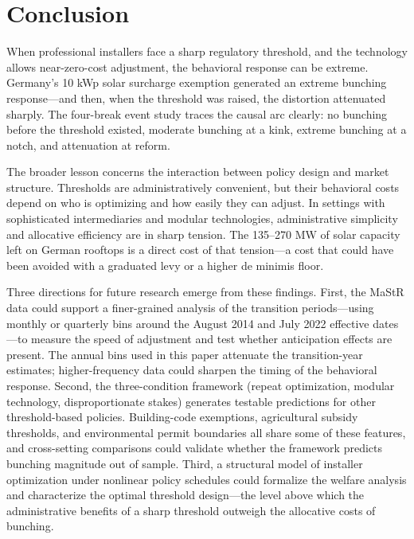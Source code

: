 \documentclass[12pt]{article}
\begin{document}



\section{Conclusion}
\label{sec:conclusion}

When professional installers face a sharp regulatory threshold, and the technology allows near-zero-cost adjustment, the behavioral response can be extreme. Germany's 10 kWp solar surcharge exemption generated an extreme bunching response---and then, when the threshold was raised, the distortion attenuated sharply. The four-break event study traces the causal arc clearly: no bunching before the threshold existed, moderate bunching at a kink, extreme bunching at a notch, and attenuation at reform.

The broader lesson concerns the interaction between policy design and market structure. Thresholds are administratively convenient, but their behavioral costs depend on who is optimizing and how easily they can adjust. In settings with sophisticated intermediaries and modular technologies, administrative simplicity and allocative efficiency are in sharp tension. The 135--270 MW of solar capacity left on German rooftops is a direct cost of that tension---a cost that could have been avoided with a graduated levy or a higher de minimis floor.

Three directions for future research emerge from these findings. First, the MaStR data could support a finer-grained analysis of the transition periods---using monthly or quarterly bins around the August 2014 and July 2022 effective dates---to measure the speed of adjustment and test whether anticipation effects are present. The annual bins used in this paper attenuate the transition-year estimates; higher-frequency data could sharpen the timing of the behavioral response. Second, the three-condition framework (repeat optimization, modular technology, disproportionate stakes) generates testable predictions for other threshold-based policies. Building-code exemptions, agricultural subsidy thresholds, and environmental permit boundaries all share some of these features, and cross-setting comparisons could validate whether the framework predicts bunching magnitude out of sample. Third, a structural model of installer optimization under nonlinear policy schedules could formalize the welfare analysis and characterize the optimal threshold design---the level above which the administrative benefits of a sharp threshold outweigh the allocative costs of bunching.
\end{document}
